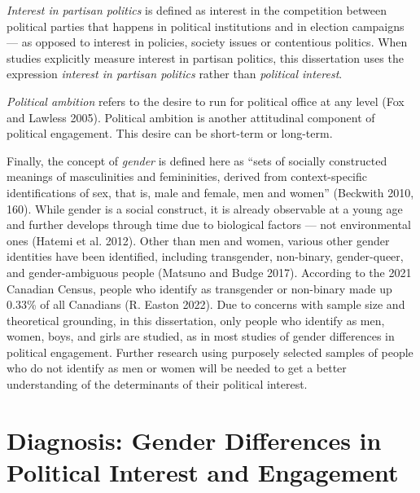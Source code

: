 \documentclass[
  letterpaper,
  DIV=11,
  numbers=noendperiod]{scrreprt}
\begin{document}
\emph{Interest in partisan politics} is defined as interest in the
competition between political parties that happens in political
institutions and in election campaigns --- as opposed to interest in
policies, society issues or contentious politics. When studies
explicitly measure interest in partisan politics, this dissertation uses
the expression \emph{interest in partisan politics} rather than
\emph{political interest}.

\emph{Political ambition} refers to the desire to run for political
office at any level (Fox and Lawless 2005). Political ambition is
another attitudinal component of political engagement. This desire can
be short-term or long-term.

Finally, the concept of \emph{gender} is defined here as ``sets of
socially constructed meanings of masculinities and femininities, derived
from context-specific identifications of sex, that is, male and female,
men and women'' (Beckwith 2010, 160). While gender is a social
construct, it is already observable at a young age and further develops
through time due to biological factors --- not environmental ones
(Hatemi et al. 2012). Other than men and women, various other gender
identities have been identified, including transgender, non-binary,
gender-queer, and gender-ambiguous people (Matsuno and Budge 2017).
According to the 2021 Canadian Census, people who identify as
transgender or non-binary made up 0.33\% of all Canadians (R. Easton
2022). Due to concerns with sample size and theoretical grounding, in
this dissertation, only people who identify as men, women, boys, and
girls are studied, as in most studies of gender differences in political
engagement. Further research using purposely selected samples of people
who do not identify as men or women will be needed to get a better
understanding of the determinants of their political interest.

\section{Diagnosis: Gender Differences in Political Interest and
Engagement}\label{diagnosis-gender-differences-in-political-interest-and-engagement}
\end{document}
